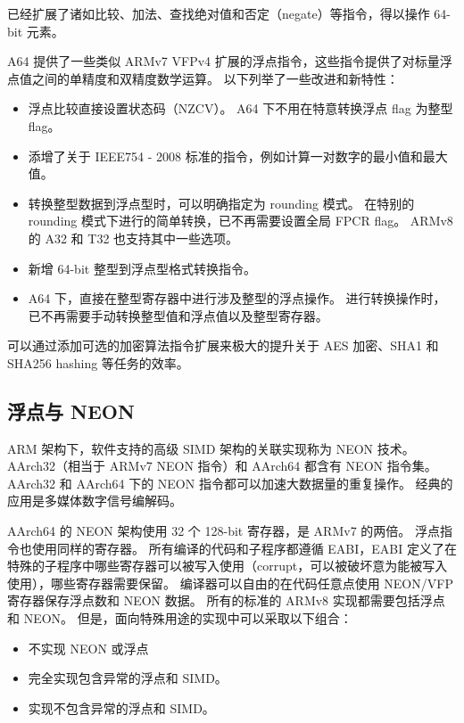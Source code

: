 已经扩展了诸如比较、加法、查找绝对值和否定（negate）等指令，得以操作 64-bit 元素。


A64 提供了一些类似 ARMv7 VFPv4 扩展的浮点指令，这些指令提供了对标量浮点值之间的单精度和双精度数学运算。
以下列举了一些改进和新特性：

\begin{itemize}
  \item 浮点比较直接设置状态码（NZCV）。
    A64 下不用在特意转换浮点 flag 为整型 flag。
  \item 添增了关于 IEEE754 - 2008 标准的指令，例如计算一对数字的最小值和最大值。
  \item 转换整型数据到浮点型时，可以明确指定为 rounding 模式。
    在特别的 rounding 模式下进行的简单转换，已不再需要设置全局 FPCR flag。
    ARMv8 的 A32 和 T32 也支持其中一些选项。
  \item 新增 64-bit 整型到浮点型格式转换指令。
  \item A64 下，直接在整型寄存器中进行涉及整型的浮点操作。
    进行转换操作时，已不再需要手动转换整型值和浮点值以及整型寄存器。
\end{itemize}


可以通过添加可选的加密算法指令扩展来极大的提升关于 AES 加密、SHA1 和 SHA256 hashing 等任务的效率。

\subsection{浮点与 NEON} \label{sec:floating-neon}

ARM 架构下，软件支持的高级 SIMD 架构的关联实现称为 NEON 技术。
AArch32（相当于 ARMv7 NEON 指令）和 AArch64 都含有 NEON 指令集。
AArch32 和 AArch64 下的 NEON 指令都可以加速大数据量的重复操作。
经典的应用是多媒体数字信号编解码。

AArch64 的 NEON 架构使用 32 个 128-bit 寄存器，是 ARMv7 的两倍。
浮点指令也使用同样的寄存器。
所有编译的代码和子程序都遵循 EABI，EABI 定义了在特殊的子程序中哪些寄存器可以被写入使用（corrupt，可以被破坏意为能被写入使用），哪些寄存器需要保留。
编译器可以自由的在代码任意点使用 NEON/VFP 寄存器保存浮点数和 NEON 数据。
所有的标准的 ARMv8 实现都需要包括浮点和 NEON。
但是，面向特殊用途的实现中可以采取以下组合：
\begin{itemize}
  \item 不实现 NEON 或浮点
  \item 完全实现包含异常的浮点和 SIMD。
  \item 实现不包含异常的浮点和 SIMD。
\end{itemize}

